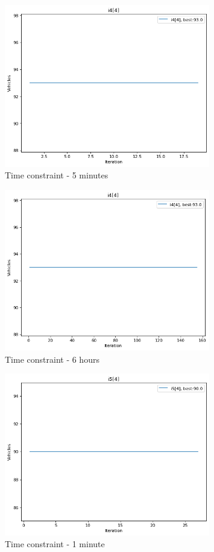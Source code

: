 \documentclass{article}
\begin{document}
\begin{figure}
\centering
\includegraphics[width=0.8\textwidth]{i4[4]_5_vehicles.png}
\caption{\label{fig:i4[4]_5_vehicles}Time constraint - 5 minutes}
\end{figure}

\begin{figure}
\centering
\includegraphics[width=0.8\textwidth]{i4[4]_360_vehicles.png}
\caption{\label{fig:i4[4]_360_vehicles}Time constraint - 6 hours}
\end{figure}

\begin{figure}
\centering
\includegraphics[width=0.8\textwidth]{i5[4]_1_vehicles.png}
\caption{\label{fig:i5[4]_1_vehicles}Time constraint - 1 minute}
\end{figure}
\end{document}
